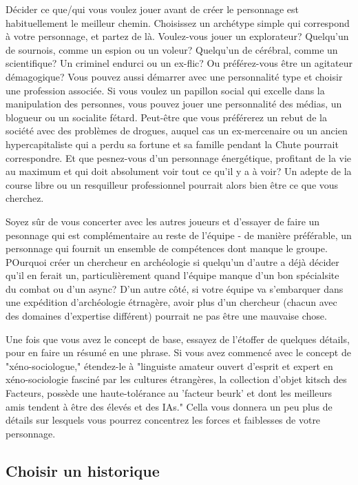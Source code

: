 Décider ce que/qui vous voulez jouer avant de créer le personnage est habituellement le meilleur chemin. Choisissez un archétype simple qui correspond à votre personnage, et partez de là. Voulez-vous jouer un explorateur? Quelqu'un de sournois, comme un espion ou un voleur? Quelqu'un de cérébral, comme un scientifique? Un criminel endurci ou un ex-flic? Ou préférez-vous être un agitateur démagogique? Vous pouvez aussi démarrer avec une personnalité type et choisir une profession associée. Si vous voulez un papillon social qui excelle dans la manipulation des personnes, vous pouvez jouer une personnalité des médias, un blogueur ou un socialite fétard. Peut-être que vous préférerez un rebut de la société avec des problèmes de drogues, auquel cas un ex-mercenaire ou un ancien hypercapitaliste qui a perdu sa fortune et sa famille pendant la Chute pourrait correspondre. Et que pesnez-vous d'un personnage énergétique, profitant de la vie au maximum et qui doit absolument voir tout ce qu'il y a à voir? Un adepte de la course libre ou un resquilleur professionnel pourrait alors bien être ce que vous cherchez. 

Soyez sûr de vous concerter avec les autres joueurs et d'essayer de faire un pesonnage qui est complémentaire au reste de l'équipe - de manière préférable, un personnage qui fournit un ensemble de compétences dont manque le groupe. POurquoi créer un chercheur en archéologie si quelqu'un d'autre a déjà décider qu'il en ferait un, particulièrement quand l'équipe manque d'un bon spécialsite du combat ou d'un async? D'un autre côté, si votre équipe va s'embarquer dans une expédition d'archéologie étrnagère, avoir plus d'un chercheur (chacun avec des domaines d'expertise différent) pourrait ne pas être une mauvaise chose. 

Une fois que vous avez le concept de base, essayez de l'étoffer de quelques détails, pour en faire un résumé en une phrase. Si vous avez commencé avec le concept de "xéno-sociologue," étendez-le à "linguiste amateur ouvert d'esprit et expert en xéno-sociologie fasciné par les cultures étrangères, la collection d'objet kitsch des Facteurs, possède une haute-tolérance au 'facteur beurk' et dont les meilleurs amis tendent à être des élevés et des IAs." Cella vous donnera un peu plus de détails sur lesquels vous pourrez concentrez les forces et faiblesses de votre personnage. 

\subsection{Choisir un historique} \label{choose-background} 

